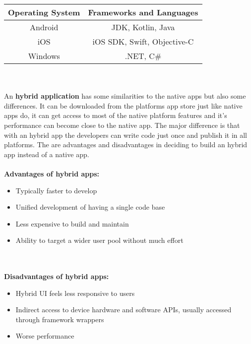 \begin{center}
 \begin{tabular}{||c c||}
 \hline
 Operating System & Frameworks and Languages \\ [0.5ex]
 \hline\hline
 Android & JDK, Kotlin, Java  \\
 \hline
 iOS & iOS SDK, Swift, Objective-C  \\
 \hline
 Windows & .NET, C#  \\
 \hline
\end{tabular}
\end{center}

 
\\ \\
An \textbf{hybrid application} has some similarities to the native apps but also some differences. It can be downloaded from the platforms app store just like native apps do, it can get access to most of the native platform features and it's performance can become close to the native app. The major difference is that with an hybrid app the developers can write code just once and publish it in all platforms. The are advantages and disadvantages in deciding to build an hybrid app instead of a native app.
\\ \\
\textbf{Advantages of hybrid apps:}

\begin{itemize}
\item
Typically faster to develop
\item 
Unified development of having a single code base
\item 
Less expensive to build and maintain
\item
Ability to target a wider user pool without much effort

\end{itemize}

\\ \\
\textbf{Disadvantages of hybrid apps:}

\begin{itemize}

\item
Hybrid UI feels less responsive to users
\item 
Indirect access to device hardware and software APIs, usually accessed through framework wrappers
\item 
Worse performance

\end{itemize}

